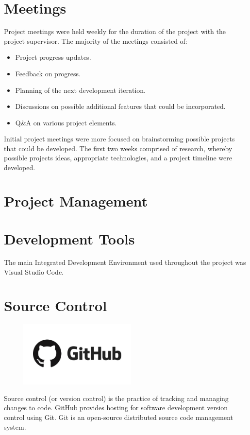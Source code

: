 \section{Meetings}
Project meetings were held weekly for the duration of the project with the project supervisor. The majority of the meetings consisted of:
\begin{itemize}
    \item Project progress updates.
    \item Feedback on progress.
    \item Planning of the next development iteration.
    \item Discussions on possible additional features that could be incorporated.
    \item Q&A on various project elements.
\end{itemize}
\par
\medskip
Initial project meetings were more focused on brainstorming possible projects that could be developed. The first two weeks comprised of research, whereby possible projects ideas, appropriate technologies, and a project timeline were developed.

\section{Project Management}

\section{Development Tools}
The main Integrated Development Environment used throughout the project was Visual Studio Code.

\newpage
\section{Source Control}
\begin{center}
    \includegraphics[width=8cm,height=3.3cm,keepaspectratio]{images/github}
\end{center}

Source control (or version control) is the practice of tracking and managing changes to code. GitHub provides hosting for software development version control using Git. Git is an open-source distributed source code management system.

